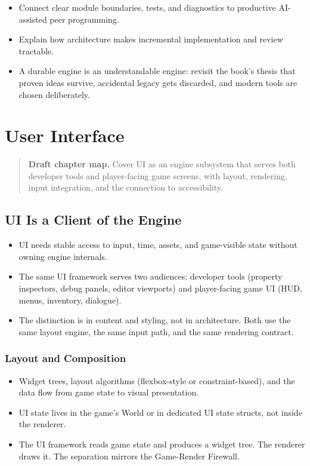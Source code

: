 \documentclass[
  11pt,
  letterpaper,
  DIV=11,
  numbers=noendperiod,
  twoside,
  open=right]{scrreprt}
\providecommand{\tightlist}{%
  \setlength{\itemsep}{0pt}\setlength{\parskip}{0pt}}
\begin{document}
\begin{itemize}
\tightlist
\item
  Connect clear module boundaries, tests, and diagnostics to productive
  AI-assisted peer programming.
\item
  Explain how architecture makes incremental implementation and review
  tractable.
\item
  A durable engine is an understandable engine: revisit the book's
  thesis that proven ideas survive, accidental legacy gets discarded,
  and modern tools are chosen deliberately.
\end{itemize}

\chapter{User Interface}\label{user-interface}

\begin{quote}
\textbf{Draft chapter map.} Cover UI as an engine subsystem that serves
both developer tools and player-facing game screens, with layout,
rendering, input integration, and the connection to accessibility.
\end{quote}

\section{UI Is a Client of the
Engine}\label{ui-is-a-client-of-the-engine}

\begin{itemize}
\tightlist
\item
  UI needs stable access to input, time, assets, and game-visible state
  without owning engine internals.
\item
  The same UI framework serves two audiences: developer tools (property
  inspectors, debug panels, editor viewports) and player-facing game UI
  (HUD, menus, inventory, dialogue).
\item
  The distinction is in content and styling, not in architecture. Both
  use the same layout engine, the same input path, and the same
  rendering contract.
\end{itemize}

\subsection{Layout and Composition}\label{layout-and-composition}

\begin{itemize}
\tightlist
\item
  Widget trees, layout algorithms (flexbox-style or constraint-based),
  and the data flow from game state to visual presentation.
\item
  UI state lives in the game's World or in dedicated UI state structs,
  not inside the renderer.
\item
  The UI framework reads game state and produces a widget tree. The
  renderer draws it. The separation mirrors the Game-Render Firewall.
\end{itemize}
\end{document}

